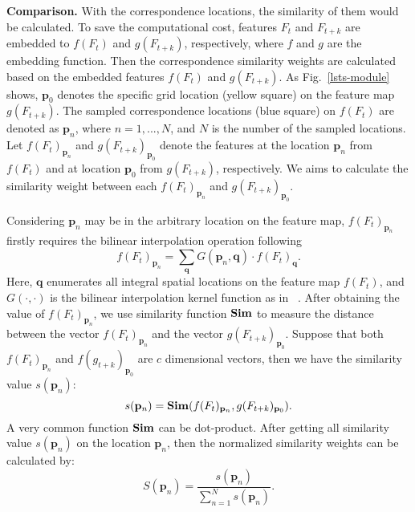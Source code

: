 \documentclass[runningheads]{llncs}
\begin{document}
\noindent \textbf{Comparison.}
With the correspondence locations, the similarity of them would be calculated. To save the computational cost, features $F_t$ and $F_{t+k}$ are embedded to $f(F_t)$ and $g(F_{t+k})$, respectively, where $f$ and $g$ are the embedding function. 
Then the correspondence similarity weights are calculated based on the embedded features $f(F_t)$ and $g(F_{t+k})$.
As Fig.~\ref{lsts-module} shows, $\mathbf{p}_0$ denotes the specific grid location (yellow square) on the feature map $g(F_{t+k})$. The sampled correspondence locations (blue square) on $f(F_t)$ are denoted as $\mathbf{p}_n$, where $n=1,...,N$, and $N$ is the number of the sampled locations. Let $f(F_t)_{\mathbf{p}_n}$ and $g(F_{t+k})_{\mathbf{p}_0}$ denote the features at the location $\mathbf{p}_n$ from $f(F_t)$ and at location $\mathbf{p}_0$ from $g(F_{t+k})$, respectively. We aims to calculate the similarity weight between each $f(F_t)_{\mathbf{p}_n}$ and $g(F_{t+k})_{\mathbf{p}_0}$.

Considering $\mathbf{p}_n$ may be in the arbitrary location on the feature map, $f(F_t)_{\mathbf{p}_n}$ firstly requires the bilinear interpolation operation following
\begin{equation}
    f(F_{t})_{\mathbf{p}_n} = \sum_{\mathbf{q}} G(\mathbf{p}_n,\mathbf{q})  \cdot f(F_{t})_{\mathbf{q}}.
\label{eqa:bilinear}
\end{equation}
Here, $\mathbf{q}$ enumerates all integral spatial locations on the feature map $f(F_t)$, and $G(\cdot,\cdot)$ is the bilinear interpolation kernel function as in ~\cite{dai2017deformable}.
After obtaining the value of $f(F_t)_{\mathbf{p}_n}$, we use similarity function $\rm \mathbf{Sim}$ to measure the distance between the vector $f(F_t)_{\mathbf{p}_n}$ and the vector $g(F_{t+k})_{\mathbf{p}_0}$. Suppose that both $f(F_t)_{\mathbf{p}_n}$ and $f(g_{t+k})_{\mathbf{p}_0}$ are $c$ dimensional vectors, then we have the similarity value $s(\mathbf{p}_n)$:
\begin{equation}
s(\mathbf{p}_n) =  {\rm \mathbf{Sim}}(f(F_t)_{\mathbf{p}_n}, g(F_{t+k})_{\mathbf{p}_0}).
\end{equation}
A very common function $\rm \mathbf{Sim}$ can be dot-product. After getting all similarity value $s(\mathbf{p}_n)$ on the location $\mathbf{p}_n$, then the normalized similarity weights can be calculated by:
\begin{equation}
S(\mathbf{p}_n) = \frac{s(\mathbf{p}_n)}{\sum_{n=1}^{N} s(\mathbf{p}_n)}.
\end{equation}
\end{document}
